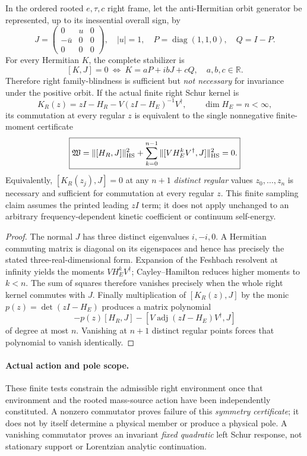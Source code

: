 \documentclass[12pt,a4paper]{article}
\begin{document}
\begin{theorem}
\label{p5c:thm:v267-finite-right-orbit-converse}
In the ordered rooted $e,\tau,c$ right frame, let the anti-Hermitian
orbit generator be represented, up to its inessential overall sign, by
\[
 J=\begin{pmatrix}0&u&0\\-\bar u&0&0\\0&0&0\end{pmatrix},
 \quad |u|=1,\quad P=\operatorname{diag}(1,1,0),\quad Q=I-P.
\]
For every Hermitian $K$, the complete stabilizer is
\[
 \boxed{[K,J]=0\ \Longleftrightarrow\
 K=aP+ibJ+cQ,\quad a,b,c\in\mathbb R.}
\]
Therefore right family-blindness is sufficient but \emph{not necessary}
for invariance under the positive orbit.
If the actual finite right Schur kernel is
\[
 K_R(z)=zI-H_R-V(zI-H_E)^{-1}V^\dagger,
 \qquad \dim H_E=n<\infty,
\]
its commutation at every regular $z$ is equivalent to the single
nonnegative finite-moment certificate
\[
 \boxed{\mathfrak W=\|[H_R,J]\|_{\rm HS}^2+
 \sum_{k=0}^{n-1}\|[VH_E^kV^\dagger,J]\|_{\rm HS}^2=0.}
\]
Equivalently, $[K_R(z_j),J]=0$ at any $n+1$ \emph{distinct regular}
values $z_0,\ldots,z_n$ is necessary and sufficient for commutation
at every regular $z$.  This finite sampling claim assumes the printed
leading $zI$ term; it does not apply unchanged to an arbitrary
frequency-dependent kinetic coefficient or continuum self-energy.
\end{theorem}
\begin{proof}
The normal $J$ has three distinct eigenvalues $i,-i,0$.  A Hermitian
commuting matrix is diagonal on its eigenspaces and hence has precisely
the stated three-real-dimensional form.  Expansion of the Feshbach
resolvent at infinity yields the moments $VH_E^kV^\dagger$;
Cayley--Hamilton reduces higher moments to $k<n$. The sum of squares
therefore vanishes precisely when the whole right kernel commutes
with $J$.  Finally multiplication of $[K_R(z),J]$ by the monic
$p(z)=\det(zI-H_E)$ produces a matrix polynomial
\[
 -p(z)[H_R,J]-[V\operatorname{adj}(zI-H_E)V^\dagger,J]
\]
of degree at most $n$. Vanishing at $n+1$ distinct regular points
forces that polynomial to vanish identically.
\end{proof}

\paragraph{Actual action and pole scope.}
These finite tests constrain the admissible right environment once
that environment and the rooted mass-source action have been
independently constituted.  A nonzero commutator proves failure of
this \emph{symmetry certificate}; it does not by itself determine a
physical member or produce a physical pole. A vanishing commutator
proves an invariant \emph{fixed quadratic} left Schur response, not
stationary support or Lorentzian analytic continuation.
\end{document}
